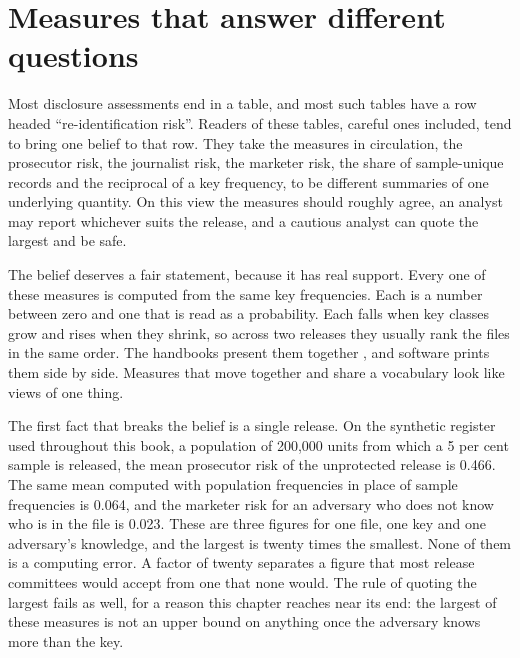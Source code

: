 \chapter{Measures that answer different questions}\label{ch:measures}

Most disclosure assessments end in a table, and most such tables have a row headed
``re-identification risk''. Readers of these tables, careful ones included, tend to
bring one belief to that row. They take the measures in circulation, the prosecutor
risk, the journalist risk, the marketer risk, the share of sample-unique records and
the reciprocal of a key frequency, to be different summaries of one underlying
quantity. On this view the measures should roughly agree, an analyst may report
whichever suits the release, and a cautious analyst can quote the largest and be safe.

The belief deserves a fair statement, because it has real support. Every one of these
measures is computed from the same key frequencies. Each is a number between zero and
one that is read as a probability. Each falls when key classes grow and rises when they
shrink, so across two releases they usually rank the files in the same order. The
handbooks present them together \citep{hundepool2012}, and software prints them side by
side. Measures that move together and share a vocabulary look like views of one thing.

The first fact that breaks the belief is a single release. On the synthetic register
used throughout this book, a population of 200,000 units from which a 5 per cent
sample is released, the mean prosecutor risk of the unprotected release is 0.466.
The same mean computed with population frequencies in place of sample frequencies is
0.064, and the marketer risk for an adversary who does not know who is in the file is
0.023.
These are three figures for one file, one key and one adversary's knowledge, and the
largest is twenty times the smallest.
None of them is a computing error. A factor of twenty separates a figure that most
release committees would accept from one that none would. The rule of quoting the
largest fails as well, for a reason this chapter reaches near its end: the largest of
these measures is not an upper bound on anything once the adversary knows more than the
key.

